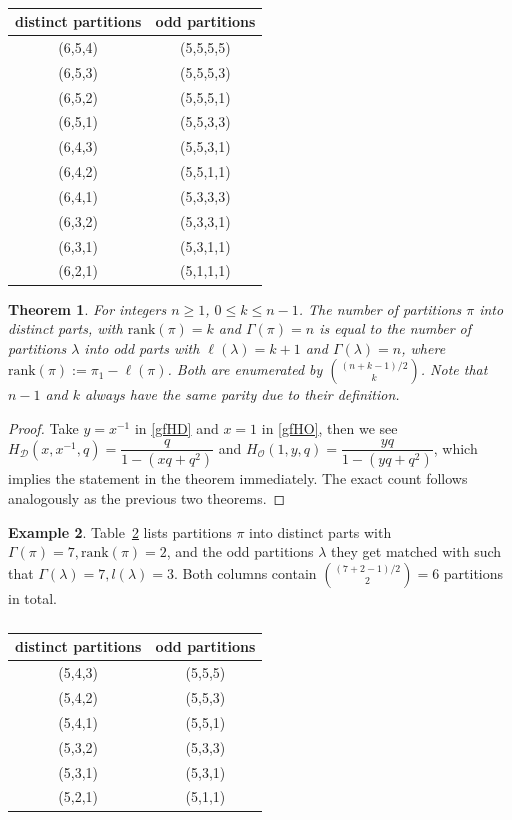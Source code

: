 \documentclass[12pt]{amsart}
\numberwithin{equation}{section}
\theoremstyle{plain}
\newtheorem{theorem}{Theorem}[section]
\theoremstyle{definition}
\newtheorem{example}[theorem]{Example}
\def\D{\mathcal{D}}
\def\O{\mathcal{O}}
\def\rank{\mathrm{rank}}
\begin{document}
\begin{table}[htbp]\caption{}
\centering
\begin{tabular}{|c|c|}
\hline
distinct partitions & odd partitions\\
\hline
(6,5,4) &(5,5,5,5)\\
\hline
(6,5,3) &(5,5,5,3)\\
\hline
(6,5,2) &(5,5,5,1)\\
\hline
(6,5,1) &(5,5,3,3)\\
\hline
(6,4,3) &(5,5,3,1)\\
\hline
(6,4,2) &(5,5,1,1)\\
\hline
(6,4,1) &(5,3,3,3)\\
\hline
(6,3,2) &(5,3,3,1)\\
\hline
(6,3,1) &(5,3,1,1)\\
\hline
(6,2,1) &(5,1,1,1)\\
\hline
\end{tabular}
\label{tab2}
\end{table}

\begin{theorem}
For integers $n\geq 1$, $0\leq k \leq n-1$. The number of partitions $\pi$ into distinct parts, with $\rank(\pi)=k$ and $\Gamma(\pi)=n$ is equal to the number of partitions $\lambda$ into odd parts with $\ell(\lambda)=k+1$ and $\Gamma(\lambda)=n$, where $\rank(\pi):=\pi_1-\ell(\pi)$. Both are enumerated by $\binom{(n+k-1)/2}{k}$. Note that $n-1$ and $k$ always have the same parity due to their definition.
\end{theorem}
\begin{proof}
Take $y=x^{-1}$ in \eqref{gfHD} and $x=1$ in \eqref{gfHO}, then we see $H_{\D}(x,x^{-1},q)=\dfrac{q}{1-(xq+q^2)}$ and $H_{\O}(1,y,q)=\dfrac{yq}{1-(yq+q^2)}$, which implies the statement in the theorem immediately. The exact count follows analogously as the previous two theorems.
\end{proof}
\begin{example}
Table~\ref{tab3} lists partitions $\pi$ into distinct parts with $\Gamma(\pi)=7, \rank(\pi)=2$, and the odd partitions $\lambda$ they get matched with such that $\Gamma(\lambda)=7, l(\lambda)=3$. Both columns contain $\binom{(7+2-1)/2}{2}=6$ partitions in total.
\end{example}

\begin{table}[htbp]\caption{}
\centering
\begin{tabular}{|c|c|}
\hline
distinct partitions & odd partitions\\
\hline
(5,4,3) &(5,5,5)\\
\hline
(5,4,2) &(5,5,3)\\
\hline
(5,4,1) &(5,5,1)\\
\hline
(5,3,2) &(5,3,3)\\
\hline
(5,3,1) &(5,3,1)\\
\hline
(5,2,1) &(5,1,1)\\
\hline
\end{tabular}
\label{tab3}
\end{table}
\end{document}

